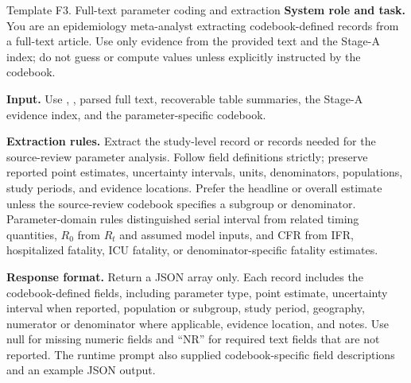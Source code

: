 \begin{prompttemplate}{Template F3. Full-text parameter coding and extraction}
\textbf{System role and task.} You are an epidemiology meta-analyst extracting codebook-defined records from a full-text article. Use only evidence from the provided text and the Stage-A index; do not guess or compute values unless explicitly instructed by the codebook.

\textbf{Input.} Use , , parsed full text, recoverable table summaries, the Stage-A evidence index, and the parameter-specific codebook.

\textbf{Extraction rules.} Extract the study-level record or records needed for the source-review parameter analysis. Follow field definitions strictly; preserve reported point estimates, uncertainty intervals, units, denominators, populations, study periods, and evidence locations. Prefer the headline or overall estimate unless the source-review codebook specifies a subgroup or denominator. Parameter-domain rules distinguished serial interval from related timing quantities, $R_0$ from $R_t$ and assumed model inputs, and CFR from IFR, hospitalized fatality, ICU fatality, or denominator-specific fatality estimates.

\textbf{Response format.} Return a JSON array only. Each record includes the codebook-defined fields, including parameter type, point estimate, uncertainty interval when reported, population or subgroup, study period, geography, numerator or denominator where applicable, evidence location, and notes. Use null for missing numeric fields and ``NR'' for required text fields that are not reported. The runtime prompt also supplied codebook-specific field descriptions and an example JSON output.
\end{prompttemplate}
